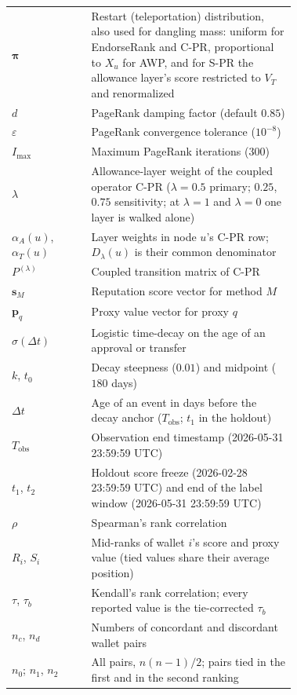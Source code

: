 \begin{table}[htbp]
{\begin{tabular}{lp{0.72\linewidth}}
$\boldsymbol{\pi}$ & Restart (teleportation) distribution, also used for dangling mass: uniform for EndorseRank and C-PR, proportional to $X_u$ for AWP, and for S-PR the allowance layer's score restricted to $V_T$ and renormalized \\
$d$ & PageRank damping factor (default $0.85$) \\
$\varepsilon$ & PageRank convergence tolerance ($10^{-8}$) \\
$I_{\max}$ & Maximum PageRank iterations ($300$) \\
$\lambda$ & Allowance-layer weight of the coupled operator C-PR ($\lambda=0.5$ primary; $0.25$, $0.75$ sensitivity; at $\lambda=1$ and $\lambda=0$ one layer is walked alone) \\
$\alpha_A(u)$, $\alpha_T(u)$ & Layer weights in node $u$'s C-PR row; $D_{\lambda}(u)$ is their common denominator \\
$P^{(\lambda)}$ & Coupled transition matrix of C-PR \\
$\mathbf{s}_M$ & Reputation score vector for method $M$ \\
$\mathbf{p}_q$ & Proxy value vector for proxy $q$ \\
$\sigma(\Delta t)$ & Logistic time-decay on the age of an approval or transfer \\
$k$, $t_0$ & Decay steepness ($0.01$) and midpoint ($180$ days) \\
$\Delta t$ & Age of an event in days before the decay anchor ($T_{\mathrm{obs}}$; $t_1$ in the holdout) \\
$T_{\mathrm{obs}}$ & Observation end timestamp (2026-05-31 23:59:59 UTC) \\
$t_1$, $t_2$ & Holdout score freeze (2026-02-28 23:59:59 UTC) and end of the label window (2026-05-31 23:59:59 UTC) \\
$\rho$ & Spearman's rank correlation \\
$R_i$, $S_i$ & Mid-ranks of wallet $i$'s score and proxy value (tied values share their average position) \\
$\tau$, $\tau_b$ & Kendall's rank correlation; every reported value is the tie-corrected $\tau_b$ \\
$n_c$, $n_d$ & Numbers of concordant and discordant wallet pairs \\
$n_0$; $n_1$, $n_2$ & All pairs, $n(n-1)/2$; pairs tied in the first and in the second ranking \\
\bottomrule
\end{tabular}
}
\end{table}

